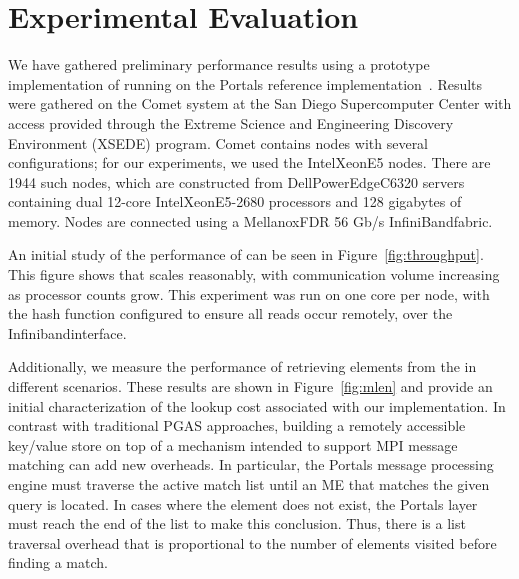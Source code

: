 \section{Experimental Evaluation}
\label{sec:results}

We have gathered preliminary performance results using a prototype
implementation of \pdht running on the Portals reference
implementation~\cite{portals-code}.  Results were gathered on the Comet
system at the San Diego Supercomputer Center with access provided
through the Extreme Science and Engineering Discovery Environment (XSEDE)
program.  Comet contains nodes with several configurations; for our
experiments, we used the Intel\regtm Xeon\regtm E5 nodes.  There are 1944 such
nodes, which are constructed from Dell\othertm PowerEdge\othertm C6320 servers
containing dual 12-core Intel\regtm Xeon\regtm E5-2680 processors and 128
gigabytes of memory.  Nodes are connected using a Mellanox\othertm FDR 56 Gb/s
InfiniBand\othertm fabric.

An initial study of the performance of \pdht can be seen in
Figure~\ref{fig:throughput}. This figure shows that \pdht scales
reasonably, with communication volume increasing as processor counts
grow. This experiment was run on one core per node, with the hash
function configured to ensure all reads occur remotely, over the
Infiniband\othertm interface.

Additionally, we measure the performance of retrieving elements
from the \pdht in different scenarios.  These results are shown in
Figure~\ref{fig:mlen} and provide an initial characterization of the lookup
cost associated with our \pdht implementation.  In contrast with traditional
PGAS approaches, building a remotely accessible key/value store on top of a
mechanism intended to support MPI message matching can add new overheads.  In
particular, the Portals message processing engine must traverse the active
match list until an ME that matches the given query is located.  In cases where
the element does not exist, the Portals layer must reach the end of the list to
make this conclusion.  Thus, there is a list traversal overhead that is
proportional to the number of elements visited before finding a match.

